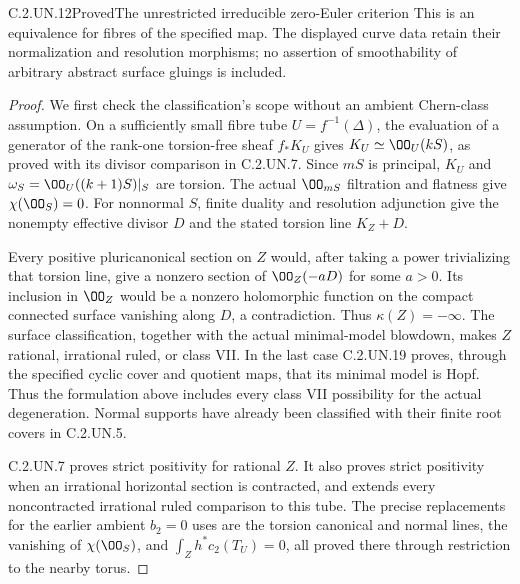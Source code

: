 \begin{statement}{C.2.UN.12}{Proved}{The unrestricted irreducible zero-Euler criterion}
This is an equivalence for fibres of the specified map.
The displayed curve data retain their normalization and
resolution morphisms; no assertion of smoothability of
arbitrary abstract surface gluings is included.
\end{statement}
\begin{proof}
We first check the classification's scope without an ambient
Chern-class assumption. On a sufficiently small fibre tube
$U=f^{-1}(\Delta)$, the evaluation of a generator of the
rank-one torsion-free sheaf $f_*K_U$ gives
$K_U\simeq\OO_U(kS)$, as proved with its divisor comparison
in C.2.UN.7. Since $mS$ is principal, $K_U$ and
$\omega_S=\OO_U((k+1)S)|_S$ are torsion. The actual
$\OO_{mS}$ filtration and flatness give
$\chi(\OO_S)=0$. For nonnormal $S$, finite duality and
resolution adjunction give the nonempty effective divisor
$D$ and the stated torsion line $K_Z+D$.

Every positive pluricanonical section on $Z$ would, after
taking a power trivializing that torsion line, give a
nonzero section of $\OO_Z(-aD)$ for some $a>0$.
Its inclusion in $\OO_Z$ would be a nonzero holomorphic
function on the compact connected surface vanishing along
$D$, a contradiction. Thus $\kappa(Z)=-\infty$.
The surface classification, together with the actual
minimal-model blowdown, makes $Z$ rational, irrational
ruled, or class VII. In the last case C.2.UN.19 proves,
through the specified cyclic cover and quotient maps,
that its minimal model is Hopf. Thus the formulation
above includes every class VII possibility for the
actual degeneration. Normal supports have already been
classified with their finite root covers in C.2.UN.5.

C.2.UN.7 proves strict positivity for rational $Z$.
It also proves strict positivity when an irrational
horizontal section is contracted, and extends every
noncontracted irrational ruled comparison to this tube.
The precise replacements for the earlier ambient $b_2=0$
uses are the torsion canonical and normal lines, the
vanishing of $\chi(\OO_S)$, and
$\int_Zh^*c_2(T_U)=0$, all proved there through restriction
to the nearby torus.


\end{proof}
